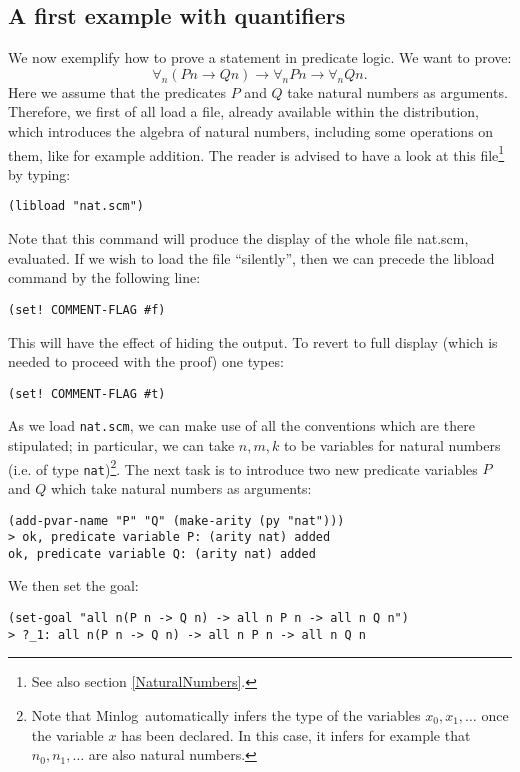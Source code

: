 \documentclass[12pt]{amsart}
\newcommand{\inquotes}[1]{``#1''}
\newcommand{\mi}{Minlog}
\begin{document}
\subsection{A first example with quantifiers}
\label{Quantifiers}
We now exemplify how to prove a statement in predicate logic.
We want to prove:
\begin{equation*}
  \forall_n (P n \to Q n) \to \forall_n P n \to \forall_n Q n.
\end{equation*}
Here we assume that the predicates $P$ and $Q$ take natural numbers as
arguments.  Therefore, we first of all load a file, already available
within the distribution, which introduces the algebra of natural
numbers, including some operations on them, like for example addition.
The reader is advised to have a look at this file\footnote{See also
  section \ref{NaturalNumbers}.} by typing:

\texttt{(libload "nat.scm")}

Note that this command will produce the display of the whole
file nat.scm, evaluated.
If we wish to load the file \inquotes{silently}, then we can
precede the libload command by the following line:
\begin{verbatim}
(set! COMMENT-FLAG #f)
\end{verbatim}
This will have the effect of hiding the output.  To revert to full
display (which is needed to proceed with the proof) one types:
\begin{verbatim}
(set! COMMENT-FLAG #t)
\end{verbatim}

As we load \texttt{nat.scm}, we can make use of all the conventions
which are there stipulated; in particular, we can take $n,m,k$ to be
variables for natural numbers (i.e. of type
\texttt{nat})\footnote{Note that \mi\ automatically infers the type of
  the variables $x_0, x_1, \dots$ once the variable $x$ has been
  declared. In this case, it infers for example that $n_0, n_1, \dots$
  are also natural numbers.}.  The next task is to introduce two new
predicate variables $P$ and $Q$ which take natural numbers as
arguments:
\begin{verbatim}
(add-pvar-name "P" "Q" (make-arity (py "nat")))
> ok, predicate variable P: (arity nat) added
ok, predicate variable Q: (arity nat) added
\end{verbatim}

We then set the goal:
\begin{verbatim}
(set-goal "all n(P n -> Q n) -> all n P n -> all n Q n")
> ?_1: all n(P n -> Q n) -> all n P n -> all n Q n
\end{verbatim}
\end{document}
